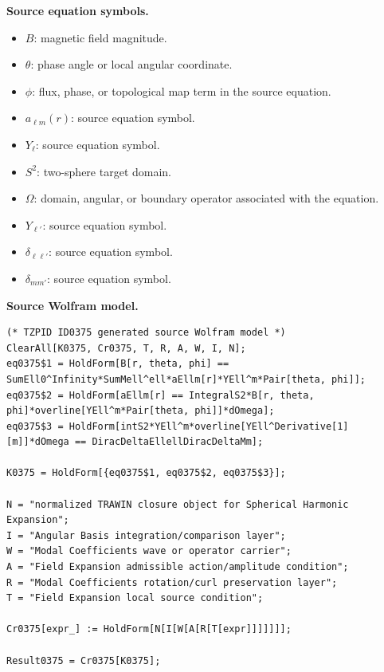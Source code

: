 \begin{minipage}[t]{0.49\linewidth}
\begingroup
\small
\raggedright
\textbf{Source equation symbols.}\par
\begin{itemize}[leftmargin=1.35em,itemsep=1pt,topsep=1pt,parsep=0pt]
    \item $B$: magnetic field magnitude.
    \item $\theta$: phase angle or local angular coordinate.
    \item $\phi$: flux, phase, or topological map term in the source equation.
    \item $a_{\ell m}(r)$: source equation symbol.
    \item $Y_{\ell}$: source equation symbol.
    \item $S^2$: two-sphere target domain.
    \item $\Omega$: domain, angular, or boundary operator associated with the equation.
    \item $Y_{\ell'}$: source equation symbol.
    \item $\delta_{\ell\ell'}$: source equation symbol.
    \item $\delta_{mm'}$: source equation symbol.
\end{itemize}
\endgroup
\end{minipage}\hfill
\begin{minipage}[t]{0.47\linewidth}
\begingroup
\scriptsize
\raggedright
\textbf{Source Wolfram model.}\par
\begin{Verbatim}[fontsize=\tiny,breaklines=true,breakanywhere=true]
(* TZPID ID0375 generated source Wolfram model *)
ClearAll[K0375, Cr0375, T, R, A, W, I, N];
eq0375$1 = HoldForm[B[r, theta, phi] == SumEll0^Infinity*SumMell^ell*aEllm[r]*YEll^m*Pair[theta, phi]];
eq0375$2 = HoldForm[aEllm[r] == IntegralS2*B[r, theta, phi]*overline[YEll^m*Pair[theta, phi]]*dOmega];
eq0375$3 = HoldForm[intS2*YEll^m*overline[YEll^Derivative[1][m]]*dOmega == DiracDeltaEllellDiracDeltaMm];

K0375 = HoldForm[{eq0375$1, eq0375$2, eq0375$3}];

N = "normalized TRAWIN closure object for Spherical Harmonic Expansion";
I = "Angular Basis integration/comparison layer";
W = "Modal Coefficients wave or operator carrier";
A = "Field Expansion admissible action/amplitude condition";
R = "Modal Coefficients rotation/curl preservation layer";
T = "Field Expansion local source condition";

Cr0375[expr_] := HoldForm[N[I[W[A[R[T[expr]]]]]]];

Result0375 = Cr0375[K0375];
\end{Verbatim}
\endgroup
\end{minipage}


